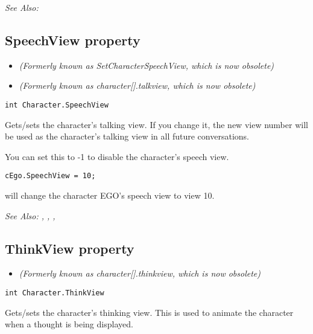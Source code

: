 \it{See Also:} 


\subsection{SpeechView property}\label{Character.SpeechView}%

\begin{itemize}
\item \it{(Formerly known as SetCharacterSpeechView, which is now obsolete)}
\item \it{(Formerly known as character[].talkview, which is now obsolete)}
\end{itemize}

\begin{verbatim}
int Character.SpeechView
\end{verbatim}
Gets/sets the character's talking view. If you change it, the new view number will
be used as the character's talking view in all future conversations.

You can set this to -1 to disable the character's speech view.

\begin{verbatim}
cEgo.SpeechView = 10;
\end{verbatim}
will change the character EGO's speech view to view 10.

\it{See Also:} ,
,
,


\subsection{ThinkView property}\label{Character.ThinkView}%

\begin{itemize}
\item \it{(Formerly known as character[].thinkview, which is now obsolete)}
\end{itemize}

\begin{verbatim}
int Character.ThinkView
\end{verbatim}
Gets/sets the character's thinking view. This is used to animate the character
when a thought is being displayed.

